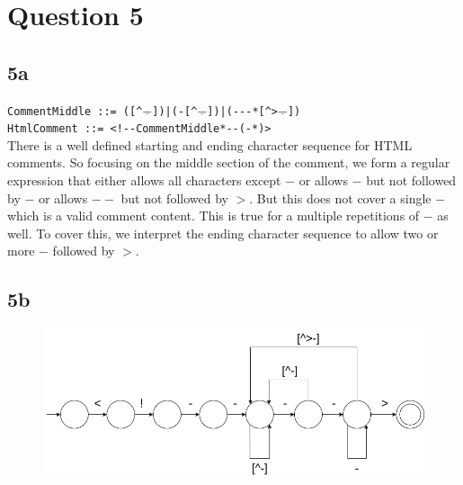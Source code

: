 \documentclass{article}
\begin{document}
    \section*{Question 5}

    \subsection*{5a}
    \verb!CommentMiddle ::= ([^!$\underline{-}$\verb!])|(-[^!$\underline{-}$\verb!])|(---*[^>!$\underline{-}$\verb!])! \\
    \verb|HtmlComment ::= <!--CommentMiddle*--(-*)>| \\

    There is a well defined starting and ending character sequence for HTML comments. So focusing on the middle section of the comment, we form a regular expression that either allows all characters except $-$ or allows $-$ but not followed by $-$ or allows $--$ but not followed by $>$. But this does not cover a single $-$ which is a valid comment content. This is true for a multiple repetitions of $-$ as well. To cover this, we interpret the ending character sequence to allow two or more $-$ followed by $>$.

    \subsection*{5b}
    \begin{figure}[H]
        \includegraphics[width=1\textwidth]{hw1-dfa5b.png}
    \end{figure}
\end{document}
